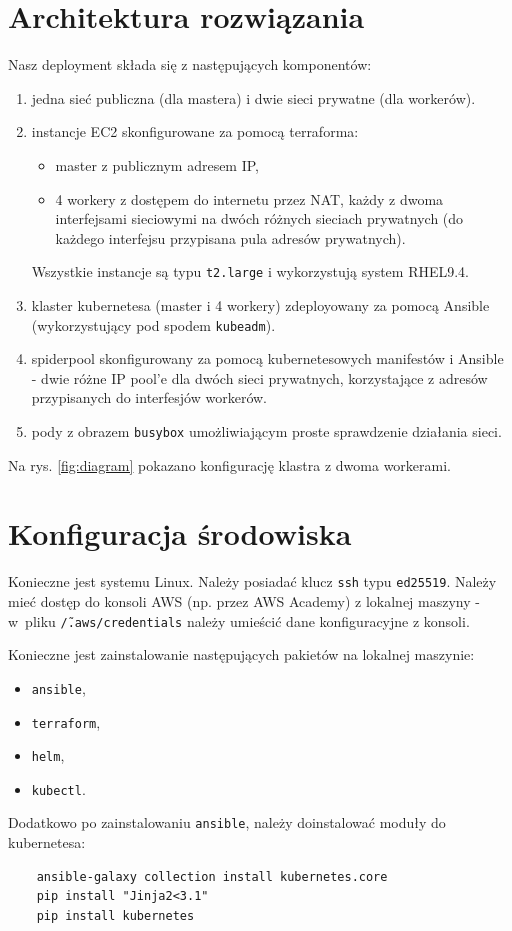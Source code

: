\documentclass[onecolumn,12pt]{article}
\begin{document}
\section{Architektura rozwiązania}
Nasz deployment składa się z następujących komponentów:
\begin{enumerate}
    \item jedna sieć publiczna (dla mastera) i dwie sieci prywatne (dla workerów).

    \item instancje EC2 skonfigurowane za pomocą terraforma:
        \begin{itemize}
            \item master z publicznym adresem IP,
            \item 4 workery z dostępem do internetu przez NAT, każdy z dwoma interfejsami sieciowymi na dwóch różnych sieciach prywatnych (do każdego interfejsu przypisana pula adresów prywatnych).
        \end{itemize}
        Wszystkie instancje są typu \texttt{t2.large} i wykorzystują system RHEL9.4.

    \item klaster kubernetesa (master i 4 workery) zdeployowany za pomocą Ansible (wykorzystujący pod spodem \texttt{kubeadm}).

    \item spiderpool skonfigurowany za pomocą kubernetesowych manifestów i Ansible - dwie różne IP pool'e dla dwóch sieci prywatnych, korzystające z adresów przypisanych do interfesjów workerów.

    \item pody z obrazem \texttt{busybox} umożliwiającym proste sprawdzenie działania sieci. 
\end{enumerate}

Na rys. \ref{fig:diagram} pokazano konfigurację klastra z dwoma workerami.

\section{Konfiguracja środowiska}

Konieczne jest systemu Linux. Należy posiadać klucz \texttt{ssh} typu \texttt{ed25519}.
Należy mieć dostęp do konsoli AWS (np. przez AWS Academy) z lokalnej maszyny - w~pliku \texttt{\~/.aws/credentials} należy umieścić dane konfiguracyjne z konsoli.

Konieczne jest zainstalowanie następujących pakietów na lokalnej maszynie:
\begin{itemize}
    \item \texttt{ansible},
    \item \texttt{terraform},
    \item \texttt{helm},
    \item \texttt{kubectl}.
\end{itemize}
Dodatkowo po zainstalowaniu \texttt{ansible}, należy doinstalować moduły do kubernetesa:
\begin{verbatim}
    ansible-galaxy collection install kubernetes.core
    pip install "Jinja2<3.1"
    pip install kubernetes
\end{verbatim}
\end{document}
